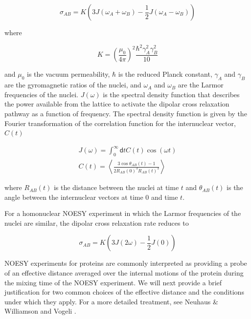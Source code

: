 \documentclass[9pt,review]{livecoms}
\begin{document}
\begin{equation}
\label{eqn:noe_cross_relaxation}
\sigma_{AB} = K \left( 3 J(\omega_A + \omega_B) - \frac {1} {2} J(\omega_A - \omega_B) \right)
\end{equation}

\noindent where

\begin{equation}
\label{eqn:noe_constant}
K = \left( \frac {\mu_0} {4 \pi} \right)^2 \frac {\hbar^2 \gamma_A^2 \gamma_B^2} {10}
\end{equation}

\noindent and $\mu_0$ is the vacuum permeability, $\hbar$ is the reduced Planck constant, $\gamma_A$ and $\gamma_B$ are the gyromagnetic ratios of the nuclei, and $\omega_A$ and $\omega_B$ are the Larmor frequencies of the nuclei.
$J(\omega)$ is the spectral density function that describes the power available from the lattice to activate the dipolar cross relaxation pathway as a function of frequency.
The spectral density function is given by the Fourier transformation of the correlation function for the internuclear vector, $C(t)$

\begin{equation}
\label{eqn:noe_spectral_density}
\begin{gathered}
J(\omega) = \int_0^\infty \mathsf{d}t C(t) \cos (\omega t) \\
C(t) = \left \langle \frac {3 \cos \theta_{AB}(t) - 1} {2 R_{AB}(0)^3 R_{AB}(t)^3} \right \rangle
\end{gathered}
\end{equation}

\noindent where $R_{AB}(t)$ is the distance between the nuclei at time $t$ and $\theta_{AB}(t)$ is the angle between the internuclear vectors at time $0$ and time $t$.

For a homonuclear NOESY experiment in which the Larmor frequencies of the nuclei are similar, the dipolar cross relaxation rate reduces to

\begin{equation}
\label{eqn:noe_homonuclear}
\sigma_{AB} = K \left( 3 J(2 \omega) - \frac {1} {2} J(0) \right)
\end{equation}

\noindent NOESY experiments for proteins are commonly interpreted as providing a probe of an effective distance averaged over the internal motions of the protein during the mixing time of the NOESY experiment.
We will next provide a brief justification for two common choices of the effective distance and the conditions under which they apply.
For a more detailed treatment, see Neuhaus \& Williamson \cite{neuhaus_nuclear_2000} and Vogeli \cite{vogeli_nuclear_2014}.
\end{document}
